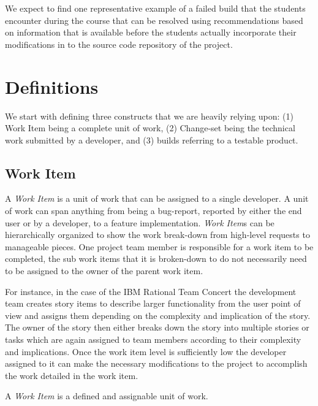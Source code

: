 We expect to find one representative example of a failed build that the students encounter during the course that can be resolved using recommendations based on information that is available before the students actually incorporate their modifications in to the source code repository of the project.

\section{Definitions}
\label{c5:sec:definitions}
We start with defining three constructs that we are heavily relying upon: (1) Work Item being a complete unit of work, (2) Change-set being the technical work submitted by a developer, and (3) builds referring to a testable product.

\subsection{Work Item}
A \emph{Work Item} is a unit of work that can be assigned to a single developer.
A unit of work can span anything from being a bug-report, reported by either the end user or by a developer, to a feature implementation.
\emph{Work Item}s can be hierarchically organized to show the work break-down from high-level requests to manageable pieces.
One project team member is responsible for a work item to be completed, the sub work items that it is broken-down to do not necessarily need to be assigned to the owner of the parent work item.

For instance, in the case of the IBM Rational Team Concert the development team creates story items to describe larger functionality from the user point of view and assigns them depending on the complexity and implication of the story.
The owner of the story then either breaks down the story into multiple stories or tasks which are again assigned to team members according to their complexity and implications.
Once the work item level is sufficiently low the developer assigned to it can make the necessary modifications to the project to accomplish the work detailed in the work item.

\begin{note}
\begin{mydef}
A \emph{Work Item} is a defined and assignable unit of work.
\end{mydef}
\end{note} 

